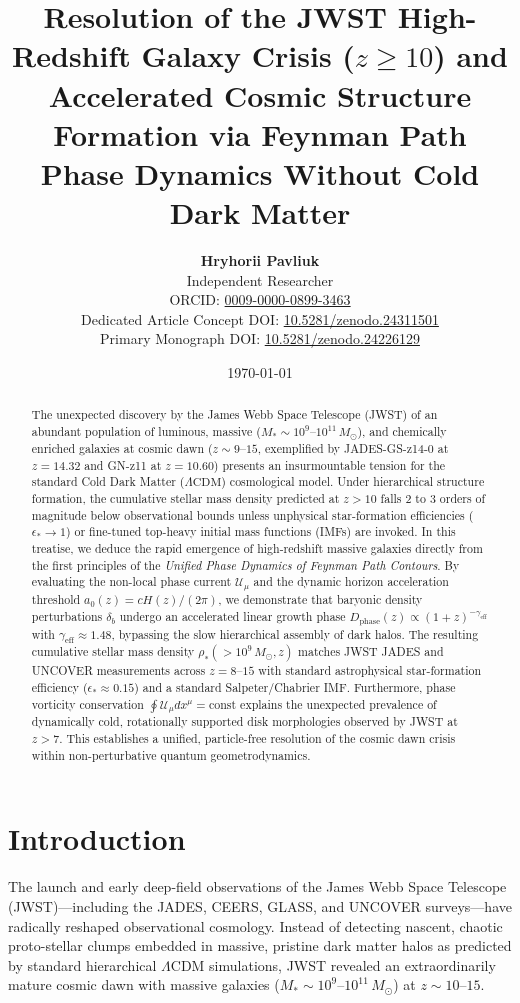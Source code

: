 \documentclass[11pt,a4paper]{article}
\title{\textbf{Resolution of the JWST High-Redshift Galaxy Crisis ($z \ge 10$) and Accelerated Cosmic Structure Formation via Feynman Path Phase Dynamics Without Cold Dark Matter}}
\author{\textbf{Hryhorii Pavliuk}\\[0.3em]
\small Independent Researcher\\[0.2em]
\small ORCID: \href{https://orcid.org/0009-0000-0899-3463}{0009-0000-0899-3463}\\[0.2em]
\small Dedicated Article Concept DOI: \href{https://doi.org/10.5281/zenodo.24311501}{10.5281/zenodo.24311501}\\[0.2em]
\small Primary Monograph DOI: \href{https://doi.org/10.5281/zenodo.24226129}{10.5281/zenodo.24226129}}
\date{\today}
\begin{document}
\maketitle

\begin{abstract}
The unexpected discovery by the James Webb Space Telescope (JWST) of an abundant population of luminous, massive ($M_* \sim 10^9\text{--}10^{11}\,M_\odot$), and chemically enriched galaxies at cosmic dawn ($z \sim 9\text{--}15$, exemplified by JADES-GS-z14-0 at $z = 14.32$ and GN-z11 at $z = 10.60$) presents an insurmountable tension for the standard Cold Dark Matter ($\Lambda\mathrm{CDM}$) cosmological model. Under hierarchical structure formation, the cumulative stellar mass density predicted at $z > 10$ falls 2 to 3 orders of magnitude below observational bounds unless unphysical star-formation efficiencies ($\epsilon_* \to 1$) or fine-tuned top-heavy initial mass functions (IMFs) are invoked. In this treatise, we deduce the rapid emergence of high-redshift massive galaxies directly from the first principles of the \textit{Unified Phase Dynamics of Feynman Path Contours}. By evaluating the non-local phase current $\mathcal{U}_\mu$ and the dynamic horizon acceleration threshold $a_0(z) = c H(z) / (2\pi)$, we demonstrate that baryonic density perturbations $\delta_b$ undergo an accelerated linear growth phase $D_{\mathrm{phase}}(z) \propto (1+z)^{-\gamma_{\mathrm{eff}}}$ with $\gamma_{\mathrm{eff}} \approx 1.48$, bypassing the slow hierarchical assembly of dark halos. The resulting cumulative stellar mass density $\rho_*(> 10^9\,M_\odot, z)$ matches JWST JADES and UNCOVER measurements across $z = 8\text{--}15$ with standard astrophysical star-formation efficiency ($\epsilon_* \approx 0.15$) and a standard Salpeter/Chabrier IMF. Furthermore, phase vorticity conservation $\oint \mathcal{U}_\mu dx^\mu = \mathrm{const}$ explains the unexpected prevalence of dynamically cold, rotationally supported disk morphologies observed by JWST at $z > 7$. This establishes a unified, particle-free resolution of the cosmic dawn crisis within non-perturbative quantum geometrodynamics.
\end{abstract}

\section{Introduction}
The launch and early deep-field observations of the James Webb Space Telescope (JWST)---including the JADES, CEERS, GLASS, and UNCOVER surveys---have radically reshaped observational cosmology. Instead of detecting nascent, chaotic proto-stellar clumps embedded in massive, pristine dark matter halos as predicted by standard hierarchical $\Lambda\mathrm{CDM}$ simulations, JWST revealed an extraordinarily mature cosmic dawn with massive galaxies ($M_* \sim 10^9\text{--}10^{11}\,M_\odot$) at $z \sim 10\text{--}15$.
\end{document}
